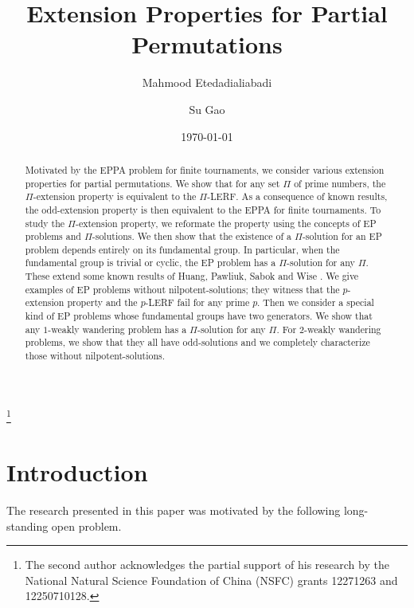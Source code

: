 \documentclass[11pt]{amsart}
\theoremstyle{definition}
\theoremstyle{definition}
\numberwithin{equation}{section}
\begin{document}
\title{Extension Properties for Partial Permutations}
\author{Mahmood Etedadialiabadi}
\address{1979 Milky Way, Verona, WI 53593, U.S.A.}

\author{Su Gao}
\address{School of Mathematical Sciences and LPMC, Nankai University, Tianjin 300071, P.R. China}
\thanks{The second author acknowledges the partial support of his research by the National Natural Science Foundation of China (NSFC) grants 12271263 and 12250710128.}

\date{\today}

\begin{abstract} Motivated by the EPPA problem for finite tournaments, we consider various extension properties for partial permutations. We show that for any set $\Pi$ of prime numbers, the $\Pi$-extension property is equivalent to the $\Pi$-LERF. As a consequence of known results, the odd-extension property is then equivalent to the EPPA for finite tournaments. To study the $\Pi$-extension property, we reformate the property using the concepts of EP problems and $\Pi$-solutions. We then show that the existence of a $\Pi$-solution for an EP problem depends entirely on its fundamental group. In particular, when the fundamental group is trivial or cyclic, the EP problem has a $\Pi$-solution for any $\Pi$. These extend some known results of Huang, Pawliuk, Sabok and Wise \cite{HPSW19}. We give examples of EP problems without nilpotent-solutions; they witness that the $p$-extension property and the $p$-LERF fail for any prime $p$. Then we consider a special kind of EP problems whose fundamental groups have two generators. We show that any $1$-weakly wandering problem has a $\Pi$-solution for any $\Pi$. For $2$-weakly wandering problems, we show that they all have odd-solutions and we completely characterize those without nilpotent-solutions. 
\end{abstract}

\maketitle
\tableofcontents



\section{Introduction}

The research presented in this paper was motivated by the following long-standing open problem.
\end{document}
